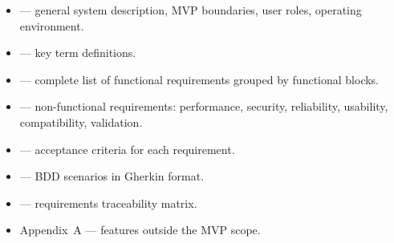 \begin{itemize}
  \item {} --- general system description, MVP boundaries, user roles, operating environment.
  \item {} --- key term definitions.
  \item {} --- complete list of functional requirements grouped by functional blocks.
  \item {} --- non-functional requirements: performance, security, reliability, usability, compatibility, validation.
  \item {} --- acceptance criteria for each requirement.
  \item {} --- BDD scenarios in Gherkin format.
  \item {} --- requirements traceability matrix.
  \item Appendix~A --- features outside the MVP scope.
\end{itemize}
